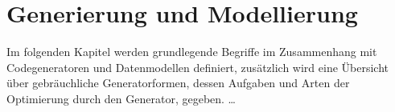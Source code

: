 \chapter{Generierung und Modellierung}
\label{chap:generation_and_modeling}


Im folgenden Kapitel werden grundlegende Begriffe im Zusammenhang mit Codegeneratoren und Datenmodellen definiert, zusätzlich wird eine Übersicht über gebräuchliche Generatorformen, dessen Aufgaben und Arten der Optimierung durch den Generator, gegeben. 
 \ldots




